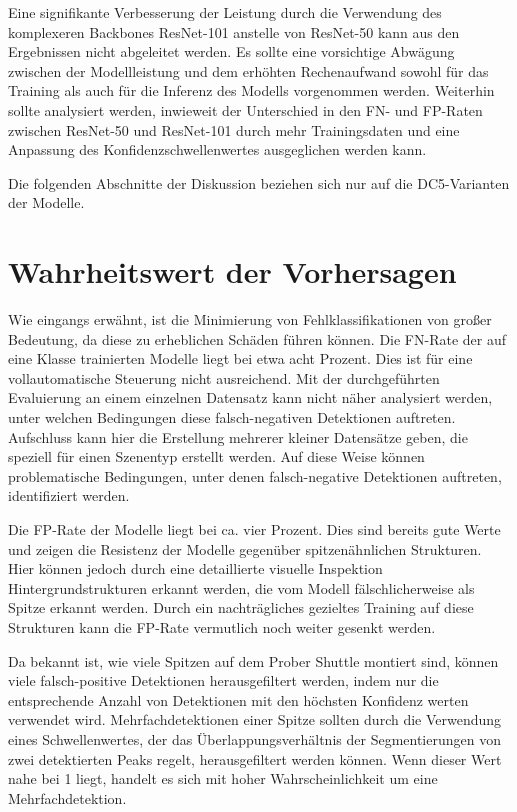 Eine signifikante Verbesserung der Leistung durch die Verwendung des komplexeren Backbones ResNet-101 anstelle von ResNet-50 kann aus den Ergebnissen nicht abgeleitet werden. Es sollte eine vorsichtige Abwägung zwischen der Modellleistung und dem erhöhten Rechenaufwand sowohl für das Training als auch für die Inferenz des Modells vorgenommen werden. Weiterhin sollte analysiert werden, inwieweit der Unterschied in den FN- und FP-Raten zwischen ResNet-50 und ResNet-101 durch mehr Trainingsdaten und eine Anpassung des Konfidenzschwellenwertes ausgeglichen werden kann.

Die folgenden Abschnitte der Diskussion beziehen sich nur auf die DC5-Varianten der Modelle.
\section{Wahrheitswert der Vorhersagen}
Wie eingangs erwähnt, ist die Minimierung von Fehlklassifikationen von großer Bedeutung, da diese zu erheblichen Schäden führen können. Die FN-Rate der auf eine Klasse trainierten Modelle liegt bei etwa acht Prozent. Dies ist für eine vollautomatische Steuerung nicht ausreichend. Mit der durchgeführten Evaluierung an einem einzelnen Datensatz kann nicht näher analysiert werden, unter welchen Bedingungen diese falsch-negativen Detektionen auftreten. Aufschluss kann hier die Erstellung mehrerer kleiner Datensätze geben, die speziell für einen Szenentyp erstellt werden. Auf diese Weise können problematische Bedingungen, unter denen falsch-negative Detektionen auftreten, identifiziert werden.

Die FP-Rate der Modelle liegt bei ca. vier Prozent. Dies sind bereits gute Werte und zeigen die Resistenz der Modelle gegenüber spitzenähnlichen Strukturen. Hier können jedoch durch eine detaillierte visuelle Inspektion Hintergrundstrukturen erkannt werden, die vom Modell fälschlicherweise als Spitze erkannt werden. Durch ein nachträgliches gezieltes Training auf diese Strukturen kann die FP-Rate vermutlich noch weiter gesenkt werden.

Da bekannt ist, wie viele Spitzen auf dem Prober Shuttle montiert sind, können viele falsch-positive Detektionen herausgefiltert werden, indem nur die entsprechende Anzahl von Detektionen mit den höchsten Konfidenz werten verwendet wird.
Mehrfachdetektionen einer Spitze sollten durch die Verwendung eines Schwellenwertes, der das Überlappungsverhältnis der Segmentierungen von zwei detektierten Peaks regelt, herausgefiltert werden können. Wenn dieser Wert nahe bei 1 liegt, handelt es sich mit hoher Wahrscheinlichkeit um eine Mehrfachdetektion.
